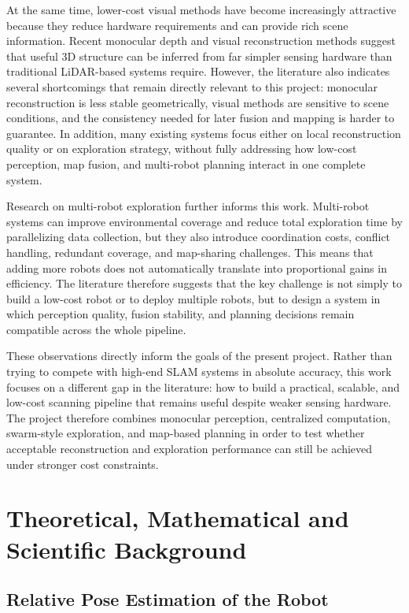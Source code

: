 \documentclass[12pt]{interim_report}
\begin{document}
At the same time, lower-cost visual methods have become increasingly attractive because they reduce hardware requirements and can provide rich scene information. Recent monocular depth and visual reconstruction methods suggest that useful 3D structure can be inferred from far simpler sensing hardware than traditional LiDAR-based systems require. However, the literature also indicates several shortcomings that remain directly relevant to this project: monocular reconstruction is less stable geometrically, visual methods are sensitive to scene conditions, and the consistency needed for later fusion and mapping is harder to guarantee. In addition, many existing systems focus either on local reconstruction quality or on exploration strategy, without fully addressing how low-cost perception, map fusion, and multi-robot planning interact in one complete system.

Research on multi-robot exploration further informs this work. Multi-robot systems can improve environmental coverage and reduce total exploration time by parallelizing data collection, but they also introduce coordination costs, conflict handling, redundant coverage, and map-sharing challenges. This means that adding more robots does not automatically translate into proportional gains in efficiency. The literature therefore suggests that the key challenge is not simply to build a low-cost robot or to deploy multiple robots, but to design a system in which perception quality, fusion stability, and planning decisions remain compatible across the whole pipeline.

These observations directly inform the goals of the present project. Rather than trying to compete with high-end SLAM systems in absolute accuracy, this work focuses on a different gap in the literature: how to build a practical, scalable, and low-cost scanning pipeline that remains useful despite weaker sensing hardware. The project therefore combines monocular perception, centralized computation, swarm-style exploration, and map-based planning in order to test whether acceptable reconstruction and exploration performance can still be achieved under stronger cost constraints.

\section{Theoretical, Mathematical and Scientific Background}


\subsection{Relative Pose Estimation of the Robot}
\label{subsec:relative-pose-estimation-zhuyu-dong}
\end{document}
